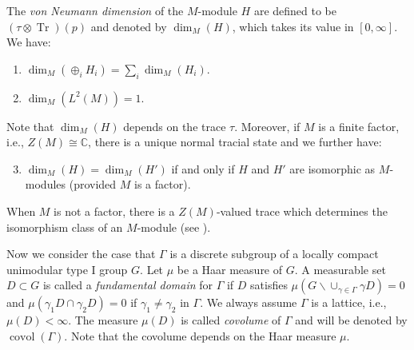 \documentclass[11pt]{article}
\theoremstyle{plain}
\theoremstyle{remark}
\theoremstyle{definition}
\DeclareMathOperator{\tr}{tr}
\DeclareMathOperator{\Tr}{Tr}
\DeclareMathOperator{\covol}{covol}
\begin{document}
The {\it von Neumann dimension} of the $M$-module $H$ are defined to be $(\tau\otimes \Tr)(p)$ and denoted by $\dim_M(H)$, which takes its value in $[0,\infty]$. 
We have: 
\begin{enumerate}
    \item $\dim_M(\oplus_i H_i)=\sum_i \dim_M(H_i)$. 
    \item $\dim_M(L^2(M))=1$.
\end{enumerate} 
Note that $\dim_M(H)$ depends on the trace $\tau$. 
Moreover, if $M$ is a finite factor, i.e., $Z(M)\cong\mathbb{C}$, there is a unique normal tracial state and we further have: 
\begin{enumerate}
\setcounter{enumi}{2}
    \item $\dim_M(H)=\dim_M(H')$ if and only if $H$ and $H'$ are isomorphic as $M$-modules (provided $M$ is a factor).  
\end{enumerate}
When $M$ is not a factor, there is a $Z(M)$-valued trace which determines the isomorphism class of an $M$-module (see \cite{Bek04}).  

Now we consider the case that $\Gamma$ is a discrete subgroup of a locally compact unimodular type I group $G$.  
Let $\mu$ be a Haar measure of $G$. A measurable set $D\subset G$ is called a {\it fundamental domain} for $\Gamma$ if $D$ satisfies $\mu(G\backslash \cup_{\gamma\in\Gamma}\gamma D)=0$ and 
$\mu(\gamma_1 D\cap \gamma_2 D)=0$ if $\gamma_1\neq \gamma_2$ in $\Gamma$. 
We always assume $\Gamma$ is a lattice, i.e., $\mu(D)<\infty$.
The measure $\mu(D)$ is called {\it covolume} of $\Gamma$ and will be denoted by $\covol(\Gamma)$. 
Note that the covolume depends on the Haar measure $\mu$.
\end{document}
